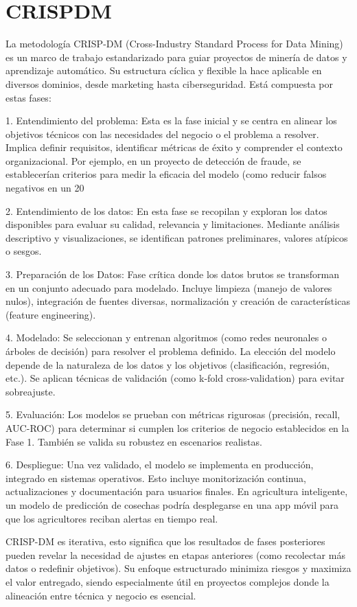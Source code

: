 
\section{CRISPDM}
La metodología CRISP-DM (Cross-Industry Standard Process for Data Mining) es un marco de trabajo estandarizado para guiar proyectos de minería de datos y aprendizaje automático. Su estructura cíclica y flexible la hace aplicable en diversos dominios, desde marketing hasta ciberseguridad. Está compuesta por estas fases:

1. Entendimiento del problema: Esta es la fase inicial y se centra en alinear los objetivos técnicos con las necesidades del negocio o el problema a resolver. Implica definir requisitos, identificar métricas de éxito y comprender el contexto organizacional. Por ejemplo, en un proyecto de detección de fraude, se establecerían criterios para medir la eficacia del modelo (como reducir falsos negativos en un 20%

2. Entendimiento de los datos: En esta fase se recopilan y exploran los datos disponibles para evaluar su calidad, relevancia y limitaciones. Mediante análisis descriptivo y visualizaciones, se identifican patrones preliminares, valores atípicos o sesgos.   

3. Preparación de los Datos: Fase crítica donde los datos brutos se transforman en un conjunto adecuado para modelado. Incluye limpieza (manejo de valores nulos), integración de fuentes diversas, normalización y creación de características (feature engineering).

4. Modelado: Se seleccionan y entrenan algoritmos (como redes neuronales o árboles de decisión) para resolver el problema definido. La elección del modelo depende de la naturaleza de los datos y los objetivos (clasificación, regresión, etc.). Se aplican técnicas de validación (como k-fold cross-validation) para evitar sobreajuste.  

5. Evaluación: Los modelos se prueban con métricas rigurosas (precisión, recall, AUC-ROC) para determinar si cumplen los criterios de negocio establecidos en la Fase 1. También se valida su robustez en escenarios realistas.

6. Despliegue: Una vez validado, el modelo se implementa en producción, integrado en sistemas operativos. Esto incluye monitorización continua, actualizaciones y documentación para usuarios finales. En agricultura inteligente, un modelo de predicción de cosechas podría desplegarse en una app móvil para que los agricultores reciban alertas en tiempo real.  

CRISP-DM es iterativa, esto significa que los resultados de fases posteriores pueden revelar la necesidad de ajustes en etapas anteriores (como recolectar más datos o redefinir objetivos). Su enfoque estructurado minimiza riesgos y maximiza el valor entregado, siendo especialmente útil en proyectos complejos donde la alineación entre técnica y negocio es esencial.